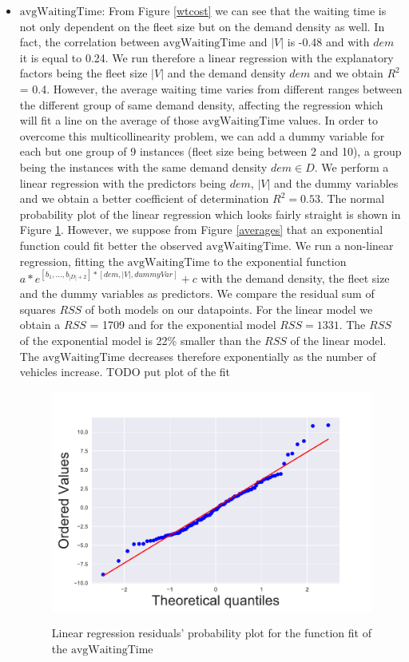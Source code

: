 \documentclass[12pt,a4paper]{article}
\begin{document}
\begin{itemize}
\item $\text{avgWaitingTime}$: From Figure \ref{wtcost} we can see that the waiting time is not only dependent on the fleet size but on the demand density as well. In fact, the correlation between $\text{avgWaitingTime}$ and $|V|$ is -0.48 and with $dem$ it is equal to 0.24. We run therefore a linear regression with the explanatory factors being the fleet size $|V|$ and the demand density $dem$ and we obtain $R^{2}$ = 0.4. However, the average waiting time varies from different ranges between the different group of same demand density, affecting the regression which will fit a line on the average of those $\text{avgWaitingTime}$ values. In order to overcome this multicollinearity problem, we can add a dummy variable for each but one group of 9 instances (fleet size being between 2 and 10), a group being the instances with the same demand density $dem \in D$. We perform a linear regression with the predictors being $dem$, $|V|$ and the dummy variables and we obtain a better coefficient of determination $R^{2} = 0.53$. The normal probability plot of the linear regression which looks fairly straight is shown in Figure \ref{probaplot}. However, we suppose from Figure \ref{averages} that an exponential function could fit better the observed $\text{avgWaitingTime}$. We run a non-linear regression, fitting the $\text{avgWaitingTime}$ to the exponential function $a * e^{[b_{1},...,b_{|D|+2}]*[dem,|V|,dummyVar]}+c$ with the demand density, the fleet size and the dummy variables as predictors. We compare the residual sum of squares $RSS$ of both models on our datapoints. For the linear model we obtain a $RSS$ =   1709 and for the exponential model $RSS = 1331$. The $RSS$ of the exponential model is 22\% smaller than the $RSS$ of the linear model. The $\text{avgWaitingTime}$ decreases therefore exponentially as the number of vehicles increase.
TODO put plot of the fit
\begin{figure}[h] 
  \centering
  \caption{Linear regression residuals' probability plot for the function fit of the $\text{avgWaitingTime}$}
\includegraphics[scale=0.4]{./images/probaplot.pdf}
\label{probaplot}
\end{figure}


\end{itemize}
\end{document}
